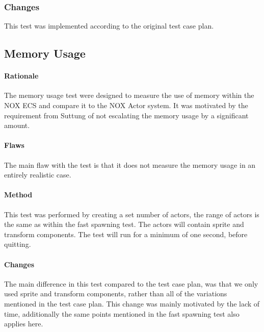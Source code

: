 \subsubsection{Changes}
This test was implemented according to the original test case plan.

\subsection{Memory Usage}
\paragraph{Rationale}
The memory usage test were designed to measure the use of memory within the NOX ECS and compare it to the NOX Actor system.
It was motivated by the requirement from Suttung of not escalating the memory usage by a significant amount.

\paragraph{Flaws}
The main flaw with the test is that it does not measure the memory usage in an entirely realistic case.

\paragraph{Method}
This test was performed by creating a set number of actors, the range of actors is the same as within the fast spawning test.
The actors will contain sprite and transform components.
The test will run for a minimum of one second, before quitting.

\paragraph{Changes}
The main difference in this test compared to the test case plan, was that we only used sprite and transform components,
rather than all of the variations mentioned in the test case plan.
This change was mainly motivated by the lack of time, additionally the same points mentioned in the fast spawning test also applies here.


